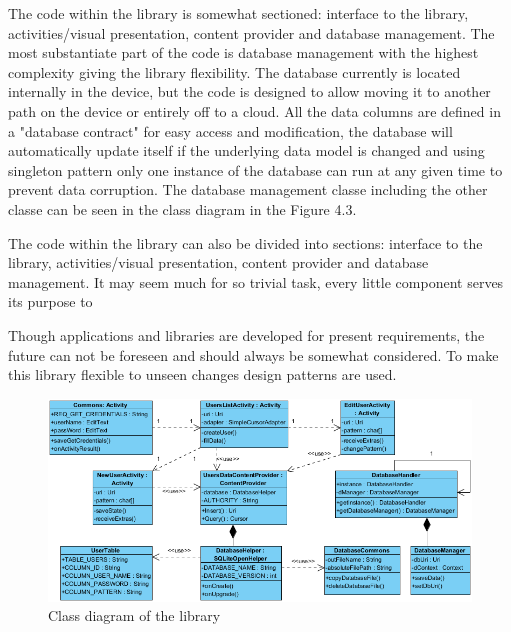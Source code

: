 The code within the library is somewhat sectioned: interface to the library, activities/visual presentation, content provider and database management. The most substantiate part of the code is database management with the highest complexity giving  the library flexibility. The database currently is located internally in the device, but the code is designed to allow moving it to another path on the device or entirely off to a cloud. All the data columns are defined in a "database contract" for easy access and modification, the database will automatically update itself if the underlying data model is changed and using singleton pattern only one instance of the database can run at any given time to prevent data corruption. The database management classe including the other classe can be seen in the class diagram in the Figure 4.3.

The code within the library can also be divided into sections: interface to the library, activities/visual presentation, content provider and database management. It may seem much for so trivial task, every little component serves its purpose to 

Though applications and libraries are developed for present requirements, the future can not be foreseen and should always be somewhat considered. To make this library flexible to unseen changes design patterns are used. 

\begin{landscape}

\begin{figure}[h]
\begin{center}
\includegraphics[scale=1.1]{images/classdiagram.png}
\caption{Class diagram of the library} \label{fig:class diagram} 
\end{center}
\end{figure}

\end{landscape}

